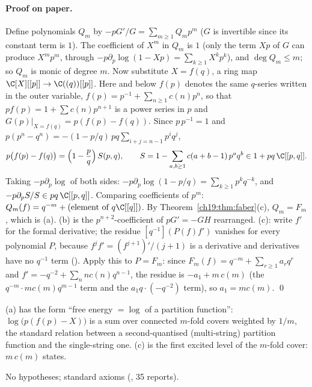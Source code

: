 \paragraph{Proof on paper.}  Define polynomials $Q_m$ by $-pG'/G=\sum_{m\ge1}Q_mp^m$ ($G$ is invertible since its constant
term is $1$).  The coefficient of $X^m$ in $Q_m$ is $1$ (only the term $Xp$ of $G$ can produce $X^mp^m$, through
$-p\partial_p\log(1-Xp)=\sum_{k\ge1}X^kp^k$), and $\deg Q_m\le m$; so $Q_m$ is monic of degree $m$.  Now substitute
$X=f(q)$, a ring map $\C[X][[p]]\to\C((q))[[p]]$.  Here and below $f(p)$ denotes the same $q$-series written in the outer
variable, $f(p)=p^{-1}+\sum_{n\ge1}c(n)p^n$, so that $pf(p)=1+\sum c(n)p^{n+1}$ is a power series in $p$ and
$G(p)|_{X=f(q)}=p(f(p)-f(q))$.  Since $p\,p^{-1}=1$ and $p(p^n-q^n)=-(1-p/q)\,pq\sum_{i+j=n-1}p^iq^j$,
\begin{equation}\label{ch19:eq:factor}
  p\bigl(f(p)-f(q)\bigr)=\Bigl(1-\frac pq\Bigr)\,S(p,q),\qquad S=1-\sum_{a,b\ge1}c(a+b-1)\,p^aq^b\in1+pq\,\C[[p,q]] .
\end{equation}
Taking $-p\partial_p\log$ of both sides: $-p\partial_p\log(1-p/q)=\sum_{k\ge1}p^kq^{-k}$, and $-p\partial_pS/S\in pq\,\C[[p,q]]$.
Comparing coefficients of $p^m$: $Q_m(f)=q^{-m}+(\text{element of }q\C[[q]])$.  By Theorem~\ref{ch19:thm:faber}(c),
$Q_m=F_m$, which is (a).  (b) is the $p^{n+2}$-coefficient of $pG'=-GH$ rearranged.  (c): write $f'$ for the formal
derivative; the residue $[q^{-1}](P(f)f')$ vanishes for every polynomial $P$, because $f^jf'=(f^{j+1})'/(j+1)$ is a
derivative and derivatives have no $q^{-1}$ term ().  Apply this to $P=F_m$: since
$F_m(f)=q^{-m}+\sum_{r\ge1}a_rq^r$ and $f'=-q^{-2}+\sum_{n}nc(n)q^{n-1}$, the residue is $-a_1+m\,c(m)$ (the
$q^{-m}\cdot mc(m)q^{m-1}$ term and the $a_1q\cdot(-q^{-2})$ term), so $a_1=mc(m)$. \qed
\begin{physics}
(a) has the form ``free energy $=\log$ of a partition function'': $\log\bigl(p(f(p)-X)\bigr)$ is a sum over connected
$m$-fold covers weighted by $1/m$, the standard relation between a second-quantised (multi-string) partition function and
the single-string one.  (c) is the first excited level of the $m$-fold cover: $m\,c(m)$ states.
\end{physics}
\begin{status}
No hypotheses; standard axioms (, 35 reports).
\end{status}

